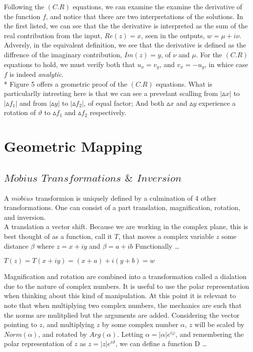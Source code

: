 \documentclass[a4paper,man,natbib]{apa6}
\begin{document}
Following the $ (C.R) $ equations, we can examine the examine the derivative of the function $ f $, and notice that there are two interpretations of the solutions.
In the first listed, we can see that the the derivative is interpreted as the sum of the real contribution from the input, $ Re(z) = x $, seen in the outputs, $ w = \mu + i\nu $.   
Adversly, in the equivalent definition, we see that the derivative is defined as the diffrence of the imaginary contribution, $ Im(z) = y $, of $ \nu $ and $ \mu $.
For the $ (C.R) $ equations to hold, we must verify both that $ u_{x} = v_{y} $, and $ v_{x} = -u_{y} $, in whice case $ f $ is indeed \textit{analytic}. \\
* Figure 5 offers a geometric proof of the $ (C.R) $ equations. 
What is particularlly intresting here is that we can see a prevelant scalling from $ |\vartriangle x| $ to $ |\vartriangle f_{1}| $ and from $ |\vartriangle y| $ to $ |\vartriangle f_{2}| $,
of equal factor; And both $ \vartriangle x $ and $ \vartriangle y $ experience a rotation of $ \vartheta $ to $ \vartriangle f_{1} $ and $ \vartriangle f_{2} $ respectively. 

\section{Geometric Mapping}
\label{sec: Mapping}

\subsection{$ M\ddot{o}bius $ $ Transformations $ $ \& $ $ Inversion $}

A $ m\ddot{o}bius $ transformion is uniquely defined by a culmination of 4 other transformations. One can consist of a part translation, magnification, rotation, and inversion.
\\
A translation a vector shift. Because we are working in the complex plane, this is best thought of as a function, call it $ T $, that 
moves a complex variable $ z $ some distance $ \beta $ where $ z = x + iy $ and $ \beta = a + ib $ Functionally \dots

\begin{center}

      $ T(z) = T(x + iy) = (x + a) + i(y +b) = w $ 

\end{center}

Magnification and rotation are combined into a transformation called a dialation due to the nature of complex numbers. 
It is useful to use the polar representation when thinking about this kind of manipulation. 
At this point it is relevant to note that when multiplying two complex numbers, the mechanics are such that the norms are mulitplied but the arguments are added. 
Considering the vector pointing to $ z $, and multiplying $ z $ by some complex number $ \alpha $, $ z $ will be scaled by $ Norm(\alpha) $, and rotated by $ Arg(\alpha) $.
Letting $ \alpha = |\alpha |e^{i\varphi} $, and remembering the polar representation of $ z $ as $ z = |z|e^{i\vartheta} $, we can define a function D \dots
\end{document}
